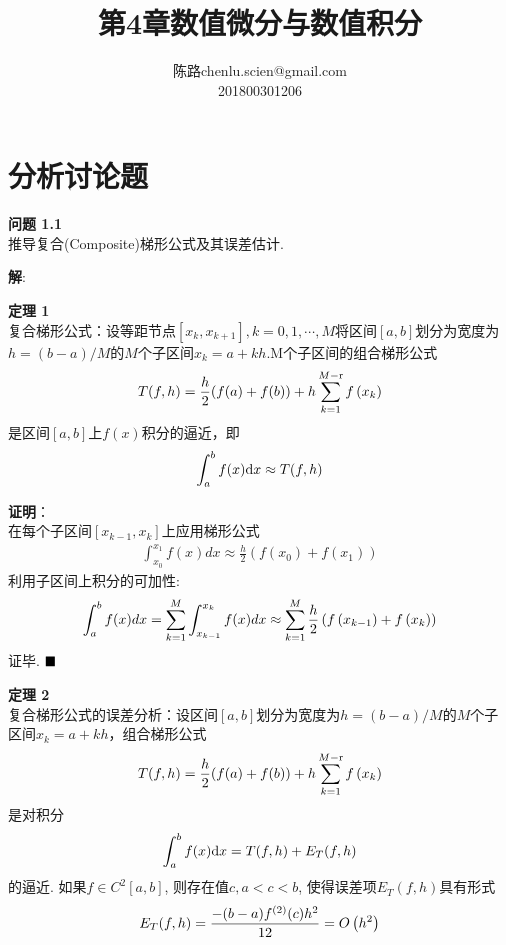 \documentclass[UTF8]{ctexart}
\makeatletter
\newenvironment{problem}[2][问题]
{\begin{mdframed}[backgroundcolor=gray!20] \textbf{#1 #2} \\}
	{\end{mdframed}}
\newenvironment{dingli}[2][定理]
{\begin{mdframed}[backgroundcolor=gray!20] \textbf{#1 #2} \\}
	{\end{mdframed}}
\newcommand\assignmentNumber{4}
\newcommand\studentName{陈路}
\newcommand\studentEmail{chenlu.scien@gmail.com}
\newcommand\studentNumber{201800301206}
\makeatother
\begin{document}
    
    \title{第\assignmentNumber 章\quad 数值微分与数值积分}
    
    \author{\name \studentName \email \studentEmail \\
    \studentNumber
    }
    
    \maketitle

\section{分析讨论题}

\begin{problem}{1.1}
	推导复合(Composite)梯形公式及其误差估计.
\end{problem}
\textbf{解}:\\
\begin{dingli}{1}
	复合梯形公式：设等距节点$[x_k,x_{k+1}], k=0,1,\cdots,M$将区间$[a,b]$划分为宽度为
	$h=(b-a)/M$的$M$个子区间$x_k=a+kh$.M个子区间的组合梯形公式
	\begin{align}
		T(f, h)=\frac{h}{2}(f(a)+f(b))+h \sum_{k=1}^{M-\mathrm{r}} f\left(x_{k}\right)\notag
	\end{align}
	是区间$[a,b]$上$f(x)$积分的逼近，即
	\begin{align}
		\int_{a}^{b} f(x) \mathrm{d} x \approx T(f, h) \notag
	\end{align}
\end{dingli}
\textbf{证明}：\\
在每个子区间$[x_{k-1},x_{k}]$上应用梯形公式
\begin{align}
	\int_{x_0}^{x_1} f(x) d x \approx \frac{h}{2} (f(x_0) + f(x_1))
\end{align}
利用子区间上积分的可加性: 
\begin{align}
	\int_{a}^{b} f(x) d x=\sum_{k=1}^{M} \int_{x_{k-1}}^{x_{k}} f(x) d x \approx \sum_{k=1}^{M} \frac{h}{2}\left(f\left(x_{k-1}\right)+f\left(x_{k}\right)\right)\notag
\end{align}
证毕. $\hfill\blacksquare$ 
\begin{dingli}{2}
	复合梯形公式的误差分析：设区间$[a,b]$划分为宽度为$h=(b-a)/M$的$M$个子区间$x_k=a+kh$，组合梯形公式
	\begin{align}
	T(f, h)=\frac{h}{2}(f(a)+f(b))+h \sum_{k=1}^{M-\mathrm{r}} f\left(x_{k}\right)\notag
	\end{align}
	是对积分
	\begin{align}
	\int_{a}^{b} f(x) \mathrm{d} x = T(f, h) + E_{T}(f,h) \notag
	\end{align}
	的逼近. 如果$f\in C^{2}[a,b]$, 则存在值$c, a<c<b$, 使得误差项$E_{T}(f,h)$具有形式
	\begin{align}
	E_{T}(f, h)=\frac{-(b-a) f^{(2)}(c) h^{2}}{12}=O\left(h^{2}\right)\notag
	\end{align}
\end{dingli}
\end{document}
